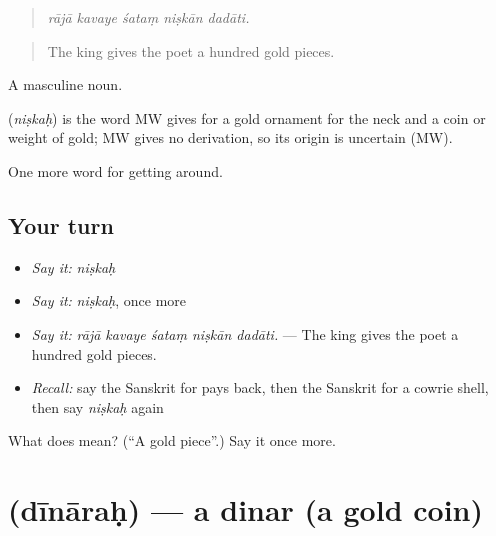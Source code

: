 \begin{quote}
    
\end{quote}

\begin{quote}
\emph{rājā kavaye śataṃ niṣkān dadāti.}
\end{quote}

\begin{quote}
The king gives the poet a hundred gold pieces.
\end{quote}

A masculine noun.

\begin{cousinweb}
\textbf{} (\emph{niṣkaḥ}) is the word MW gives for a gold ornament for the neck and a coin or weight of gold; MW gives no derivation, so its origin is uncertain (MW).
\end{cousinweb}

\begin{grammarlens}[title={What you've built}]
One more word for getting around.
\end{grammarlens}

\subsection*{Your turn}
\begin{itemize}
\raggedright
  \item \emph{Say it:} \emph{niṣkaḥ}
  \item \emph{Say it:} \emph{niṣkaḥ}, once more
  \item \emph{Say it:} \emph{rājā kavaye śataṃ niṣkān dadāti.} — The king gives the poet a hundred gold pieces.
  \item \emph{Recall:} say the Sanskrit for pays back, then the Sanskrit for a cowrie shell, then say \emph{niṣkaḥ} again
\end{itemize}

\begin{tcolorbox}[breakable,colback=teal!4,colframe=teal!35!black,title={Before you move on}]
What does  mean? (\textquotedblleft{}A gold piece\textquotedblright{}.) Say it once more.
\end{tcolorbox}
\section[\texorpdfstring{\sk{दीनारः} (dīnāraḥ)}{दीनारः (dīnāraḥ)}]{ (dīnāraḥ) — a dinar (a gold coin)}

